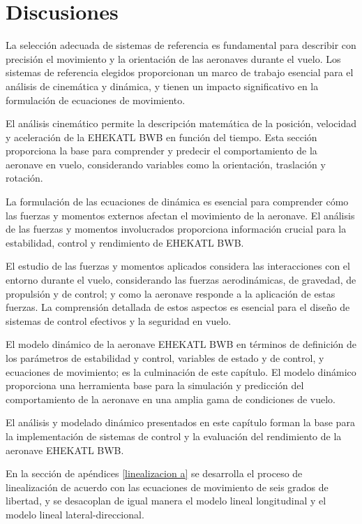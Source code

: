 \section{Discusiones}

La selección adecuada de sistemas de referencia es fundamental para describir con precisión el movimiento y la orientación de las aeronaves durante el vuelo. Los sistemas de referencia elegidos proporcionan un marco de trabajo esencial para el análisis de cinemática y dinámica, y tienen un impacto significativo en la formulación de ecuaciones de movimiento.

El análisis cinemático permite la descripción matemática de la posición, velocidad y aceleración de la EHEKATL BWB en función del tiempo. Esta sección proporciona la base para comprender y predecir el comportamiento de la aeronave en vuelo, considerando variables como la orientación, traslación y rotación.

La formulación de las ecuaciones de dinámica es esencial para comprender cómo las fuerzas y momentos externos afectan el movimiento de la aeronave. El análisis de las fuerzas y momentos involucrados proporciona información crucial para la estabilidad, control y rendimiento de EHEKATL BWB.

El estudio de las fuerzas y momentos aplicados considera las interacciones con el entorno durante el vuelo, considerando las fuerzas aerodinámicas, de gravedad, de propulsión y de control; y como la aeronave responde a la aplicación de estas fuerzas. La comprensión detallada de estos aspectos es esencial para el diseño de sistemas de control efectivos y la seguridad en vuelo.

El modelo dinámico de la aeronave EHEKATL BWB en términos de definición de los parámetros de estabilidad y control, variables de estado y de control, y ecuaciones de movimiento; es la culminación de este capítulo. El modelo dinámico proporciona una herramienta base para la simulación y predicción del comportamiento de la aeronave en una amplia gama de condiciones de vuelo.

El análisis y modelado dinámico presentados en este capítulo forman la base para la implementación de sistemas de control y la evaluación del rendimiento de la aeronave EHEKATL BWB.

En la sección de apéndices \ref{linealizacion a} se desarrolla el proceso de linealización de acuerdo con las ecuaciones de movimiento de seis grados de libertad, y se desacoplan de igual manera el modelo lineal longitudinal y el modelo lineal lateral-direccional.





